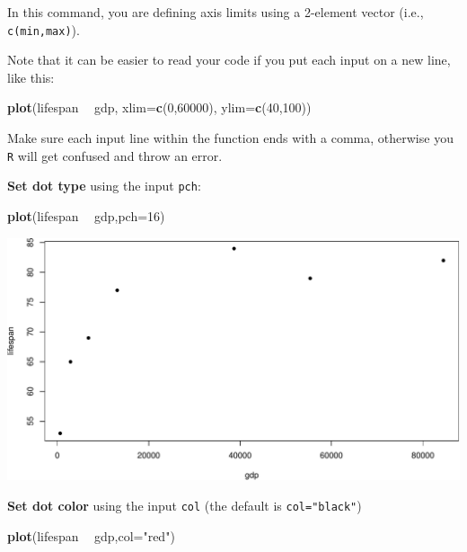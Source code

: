 \documentclass[
]{book}
\newenvironment{Shaded}{\begin{snugshade}}{\end{snugshade}}
\newcommand{\DataTypeTok}[1]{\textcolor[rgb]{0.13,0.29,0.53}{#1}}
\newcommand{\DecValTok}[1]{\textcolor[rgb]{0.00,0.00,0.81}{#1}}
\newcommand{\KeywordTok}[1]{\textcolor[rgb]{0.13,0.29,0.53}{\textbf{#1}}}
\newcommand{\NormalTok}[1]{#1}
\newcommand{\OperatorTok}[1]{\textcolor[rgb]{0.81,0.36,0.00}{\textbf{#1}}}
\newcommand{\StringTok}[1]{\textcolor[rgb]{0.31,0.60,0.02}{#1}}
\begin{document}
In this command, you are defining axis limits using a 2-element vector (i.e., \texttt{c(min,max)}).

Note that it can be easier to read your code if you put each input on a new line, like this:

\begin{Shaded}
\begin{Highlighting}[]
\KeywordTok{plot}\NormalTok{(lifespan }\OperatorTok{~}\StringTok{ }\NormalTok{gdp,}
     \DataTypeTok{xlim=}\KeywordTok{c}\NormalTok{(}\DecValTok{0}\NormalTok{,}\DecValTok{60000}\NormalTok{),}
     \DataTypeTok{ylim=}\KeywordTok{c}\NormalTok{(}\DecValTok{40}\NormalTok{,}\DecValTok{100}\NormalTok{))}
\end{Highlighting}
\end{Shaded}

Make sure each input line within the function ends with a comma, otherwise you \texttt{R} will get confused and throw an error.

\textbf{Set dot type} using the input \texttt{pch}:

\begin{Shaded}
\begin{Highlighting}[]
\KeywordTok{plot}\NormalTok{(lifespan }\OperatorTok{~}\StringTok{ }\NormalTok{gdp,}\DataTypeTok{pch=}\DecValTok{16}\NormalTok{)}
\end{Highlighting}
\end{Shaded}

\includegraphics{figures/unnamed-chunk-228-1.pdf}

\textbf{Set dot color} using the input \texttt{col} (the default is \texttt{col="black"})

\begin{Shaded}
\begin{Highlighting}[]
\KeywordTok{plot}\NormalTok{(lifespan }\OperatorTok{~}\StringTok{ }\NormalTok{gdp,}\DataTypeTok{col=}\StringTok{"red"}\NormalTok{)}
\end{Highlighting}
\end{Shaded}
\end{document}
